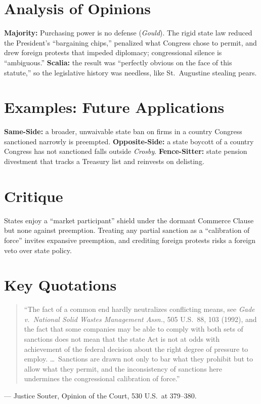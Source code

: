 \documentclass[12pt]{article}
\begin{document}
\section{Analysis of Opinions}
\textbf{Majority:} Purchasing power is no defense (\textit{Gould}). The rigid state law reduced the President's ``bargaining chips,'' penalized what Congress chose to permit, and drew foreign protests that impeded diplomacy; congressional silence is ``ambiguous.'' \textbf{Scalia:} the result was ``perfectly obvious on the face of this statute,'' so the legislative history was needless, like St.\ Augustine stealing pears.

\section{Examples: Future Applications}
\textbf{Same-Side:} a broader, unwaivable state ban on firms in a country Congress sanctioned narrowly is preempted. \textbf{Opposite-Side:} a state boycott of a country Congress has not sanctioned falls outside \textit{Crosby}. \textbf{Fence-Sitter:} state pension divestment that tracks a Treasury list and reinvests on delisting.

\section{Critique}
States enjoy a ``market participant'' shield under the dormant Commerce Clause but none against preemption. Treating any partial sanction as a ``calibration of force'' invites expansive preemption, and crediting foreign protests risks a foreign veto over state policy.

\section{Key Quotations}
\begin{quote}
``The fact of a common end hardly neutralizes conflicting means, see \textit{Gade v.\ National Solid Wastes Management Assn.}, 505 U.S.\ 88, 103 (1992), and the fact that some companies may be able to comply with both sets of sanctions does not mean that the state Act is not at odds with achievement of the federal decision about the right degree of pressure to employ. \dots\ Sanctions are drawn not only to bar what they prohibit but to allow what they permit, and the inconsistency of sanctions here undermines the congressional calibration of force.''
\end{quote}
\noindent --- Justice Souter, Opinion of the Court, 530 U.S.\ at 379--380.
\end{document}
